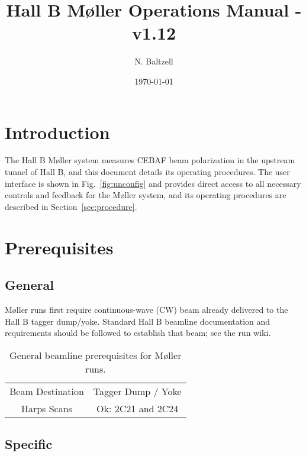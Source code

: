\documentclass[amsmath,amssymb,notitlepage,12pt]{revtex4}
\begin{document}
\title{Hall B M{\o}ller Operations Manual - v1.12}
\date{\today}
\author{N. Baltzell}
\begin{abstract}
\end{abstract}
\maketitle

\tableofcontents

\newpage 

\section{Introduction}

The Hall B M{\o}ller system measures CEBAF beam polarization in the upstream tunnel of Hall B, and this document details its operating procedures.  The user interface is shown in Fig.~\ref{fig:unconfig} and provides direct access to all necessary controls and feedback for the M{\o}ller system, and its operating procedures are described in Section~\ref{sec:procedure}.

\section{Prerequisites}\label{sec:prereq}

\subsection{General}

M{\o}ller runs first require continuous-wave (CW) beam already delivered to the Hall B tagger dump/yoke.  Standard Hall B beamline documentation and requirements should be followed to establish that beam;  see the run wiki.

\begin{table}[htbp]\centering
    \begin{tabular}{c|c}\toprule[1.5pt]
        Beam Destination & Tagger Dump / Yoke \\
        Harps Scans & Ok: 2C21 and 2C24\\ 
        \bottomrule[1.5pt]
    \end{tabular}
    \caption{General beamline prerequisites for M{\o}ller runs.}
\end{table}

\subsection{Specific}
\end{document}
